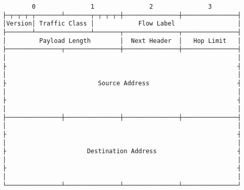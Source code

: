 \documentclass[varwidth=25cm,crop]{standalone}
\begin{document}
\begin{verbatim}
        0               1               2               3
├─┬─┬─┬─┬───────┴───────┬─┬─┬─┬─┼───────────────┼───────────────┤
│Version│ Traffic Class │            Flow Label                 │
├───────┴───────────────┴───────┬───────────────┬───────────────┤
│         Payload Length        │  Next Header  │   Hop Limit   │
├───────────────┬───────────────┼───────────────┼───────────────┤
│                                                               │
├                                                               ┤
│                                                               │
├                         Source Address                        ┤
│                                                               │
├                                                               ┤
│                                                               │
├───────────────┼───────────────┼───────────────┼───────────────┤
│                                                               │
├                                                               ┤
│                                                               │
├                      Destination Address                      ┤
│                                                               │
├                                                               ┤
│                                                               │
└───────────────┴───────────────┴───────────────┴───────────────┘
\end{verbatim}
\end{document}
